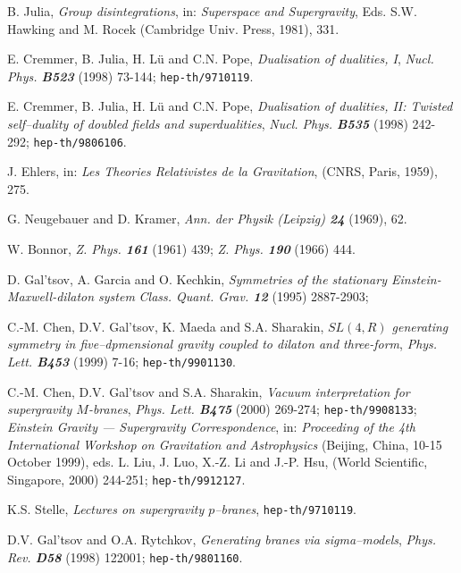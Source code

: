 \documentclass[a4paper,12pt]{article}
\begin{document}
\begin{thebibliography}{99}
    B. Julia,
    {\sl Group disintegrations},
    in: {\it Superspace and Supergravity},
    Eds. S.W. Hawking and M. Rocek (Cambridge Univ. Press, 1981), 331.

    E. Cremmer, B. Julia, H. L\"u and C.N. Pope,
    {\sl Dualisation of dualities, I},
    {\it Nucl. Phys. \bf B523} (1998) 73-144;
    {\tt hep-th/9710119}.

    E. Cremmer, B. Julia, H. L\"u and C.N. Pope,
    {\sl Dualisation of dualities, II: Twisted self--duality of doubled
         fields and superdualities},
    {\it Nucl. Phys. \bf B535} (1998) 242-292;
    {\tt hep-th/9806106}.

    J. Ehlers,
    in: {\it Les Theories Relativistes de la Gravitation},
    (CNRS, Paris, 1959), 275.

    G. Neugebauer and D. Kramer,
    {\it Ann. der Physik (Leipzig) \bf 24} (1969), 62.

    W. Bonnor,
    {\sl Z. Phys. \bf 161} (1961) 439; {\sl Z. Phys. \bf 190} (1966) 444.

    D. Gal'tsov, A. Garcia and O. Kechkin,
    {\sl Symmetries of the stationary Einstein-Maxwell-dilaton system}
    {\it Class. Quant. Grav. \bf 12} (1995) 2887-2903;

    C.-M. Chen, D.V. Gal'tsov, K. Maeda and S.A. Sharakin,
    {\sl $SL(4,R)$ generating symmetry in five--dpmensional gravity coupled
         to dilaton and three-form},
    {\it Phys. Lett. \bf B453} (1999) 7-16;
    {\tt hep-th/9901130}.

    C.-M. Chen, D.V. Gal'tsov and S.A. Sharakin,
    {\sl Vacuum interpretation for supergravity $M$-branes},
    {\it Phys. Lett. \bf B475} (2000) 269-274;
    {\tt hep-th/9908133}; {\sl Einstein Gravity --- Supergravity Correspondence},
    in: {\it Proceeding of the 4th International Workshop on
             Gravitation and Astrophysics}
    (Beijing, China, 10-15 October 1999),
    eds. L. Liu, J. Luo, X.-Z. Li and J.-P. Hsu,
    (World Scientific, Singapore, 2000) 244-251;
    {\tt hep-th/9912127}.

    K.S. Stelle,
    {\sl Lectures on supergravity $p$--branes},
    {\tt hep-th/9710119}.

    D.V. Gal'tsov and O.A. Rytchkov,
    {\sl Generating branes via sigma--models},
    {\it Phys. Rev. \bf D58} (1998) 122001;
    {\tt hep-th/9801160}.


\end{thebibliography}
\end{document}
